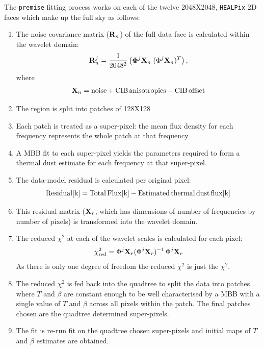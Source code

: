 \documentclass[a4paper,fleqn,usenatbib]{mnras}
\begin{document}
The {\texttt{premise}} fitting process works on each of the twelve 2048X2048, {\texttt{HEALPix}} 2D faces which make up the full sky as follows:
\begin{enumerate}[label*=\arabic*.]
\item The noise covariance matrix (${\bf{R}}_{n}$) of the full data face is calculated within the wavelet domain:
\begin{eqnarray}
{\bf{R}}_{n}^{j} = \frac{1}{2048^2} \left( {\bf{ \Phi}}^{j} {\bf{X}}_{n} \;  (\Phi^{j} {\bf{X}}_{n})^{T} \right),
\end{eqnarray} 
where 
\begin{eqnarray}
\nonumber
 {\bf{X}}_{n} = \rm{noise + CIB \, anisotropies - CIB \, offset}
 \end{eqnarray} 
\item The region is split into patches of 128X128
\item Each patch is treated as a super-pixel: the mean flux density for each frequency represents the whole patch at that frequency	
\item A MBB fit to each super-pixel yields the parameters required to form a thermal dust estimate for each frequency at that super-pixel.
\item The data-model residual is calculated per original pixel:
$$
\rm{Residual}[k] = \rm{Total \, Flux}[k] -  \rm{Estimated \, thermal \, dust \, flux}[k] 
$$
\item This residual matrix (${\bf{X}}_{r}$, which has dimensions of number of frequencies by number of pixels) is transformed into the wavelet domain. 
\item The reduced $\chi^{2}$ at each of the wavelet scales is calculated for each pixel:
\begin{eqnarray}
\chi^{2}_{\rm{red}} = \Phi^{j} {\bf{X}}_{r}  (\Phi^{j} {\bf{X}}_{r})^{-1} \, \Phi^{j} {\bf{X}}_{r} 
\end{eqnarray}
As there is only one degree of freedom the reduced $\chi^{2}$ is just the $\chi^{2}$.
\item The reduced $\chi^{2}$ is fed back into the quadtree to split the data into patches where $T$ and $\beta$ are constant enough to be well characterised by a MBB with a single value of $T$ and $\beta$ across all pixels within the patch. The final patches chosen are the quadtree determined super-pixels.  
\item The fit is re-run fit on the quadtree chosen super-pixels and initial maps of $T$ and $\beta$ estimates are obtained.
\end{enumerate}
\end{document}
